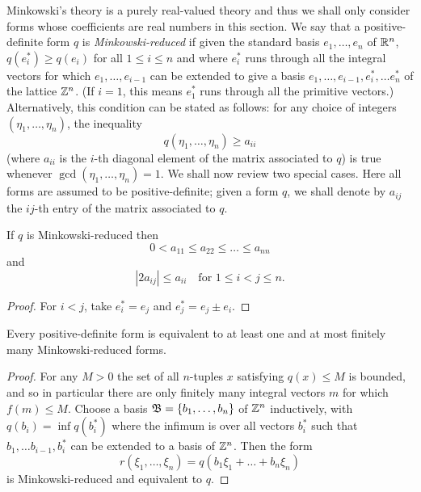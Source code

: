 Minkowski's theory is a purely real-valued theory and thus we shall only
consider forms whose coefficients are real numbers in this section. We say that
a positive-definite form \(q\) is \emph{Minkowski-reduced} if given the standard
basis \(e_1, \dots, e_n\) of \(\mathbb{R}^n\), \(q(e^*_i) \geq q(e_i)\) for all \(1
\leq i \leq n\) and where \(e^*_i\) runs through all the integral vectors for
which \(e_1, \dots, e_{i-1}\) can be extended to give a basis \(e_1, \dots,
e_{i-1}, e^*_i, \dots e^*_n\) of the lattice \(\mathbb{Z}^n\). (If \(i = 1\),
this means \(e^*_1\) runs through all the primitive vectors.)
\cite[p.\,255]{cassels2008rational} Alternatively, this condition can be stated
as follows: for any choice of integers \((\eta_1, \dots, \eta_n)\), the
inequality
\[
    q(\eta_1, \dots, \eta_n) \geq a_{ii}
\]
(where \(a_{ii}\) is the \(i\)-th diagonal element of the matrix associated to
\(q\)) is true whenever \(\gcd(\eta_1, \dots, \eta_n) = 1\). We shall now review
two special cases. Here all forms are assumed to be positive-definite; given a
form \(q\), we shall denote by \(a_{ij}\) the \(ij\)-th entry of the matrix
associated to \(q\).

\begin{lemma}
    If \(q\) is Minkowski-reduced then
    \[
        0 < a_{11} \leq a_{22} \leq \dots \leq a_{nn}
    \]
    and 
    \[
        |2a_{ij}| \leq a_{ii} \quad \text{for } 1 \leq i < j \leq n.
    \]
\end{lemma}

\begin{proof}
    For \(i < j\), take \(e^*_i = e_j\) and \(e^*_j = e_j \pm e_i\).
\end{proof}

\begin{theoremx}
    Every positive-definite form is equivalent to at least one and at most
    finitely many Minkowski-reduced forms.
\end{theoremx}

\begin{proof}
    For any \(M > 0\) the set of all \(n\)-tuples \(x\) satisfying \(q(x) \leq
    M\) is bounded, and so in particular there are only finitely many integral
    vectors \(m\) for which \(f(m) \leq M\). Choose a basis \(\mathfrak{B} = \{b_1,
    \dots, b_n\}\) of \(\mathbb{Z}^n\) inductively, with \(q(b_i) = \inf
    q(b^*_i)\) where the infimum is over all vectors \(b^*_i\) such that \(b_1,
    \dots b_{i-1}, b^*_i\) can be extended to a basis of \(\mathbb{Z}^n\). Then
    the form
    \[
        r(\xi_1, \dots, \xi_n) = q(b_1 \xi_1 + \dots + b_n \xi_n)
    \]
    is Minkowski-reduced and equivalent to \(q\).
\end{proof}

